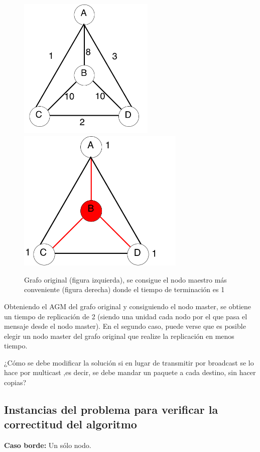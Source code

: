 \documentclass[a4paper, 10pt, twoside]{article}
\begin{document}
\begin{figure}[H]
\centering
\includegraphics[width=65mm]{contraej.png}
\includegraphics[width=80mm]{contraejMasterB.png}
\caption{Grafo original (figura izquierda), se consigue el nodo maestro más conveniente (figura derecha) donde el tiempo de terminación es 1}
\end{figure} 

Obteniendo el AGM del grafo original y consiguiendo el nodo master, se obtiene un tiempo de replicación de 2 (siendo una unidad cada nodo por el que pasa el mensaje desde el nodo master). En el segundo caso, puede verse que es posible elegir un nodo master del grafo original que realize la replicación en menos tiempo.

¿Cómo se debe modificar la solución si en lugar de transmitir por broadcast se lo hace por
multicast ,es decir, se debe mandar un paquete a cada destino, sin hacer copias?


\subsection{Instancias del problema para verificar la correctitud del algoritmo}

\textbf{Caso borde:} Un sólo nodo.
\end{document}
